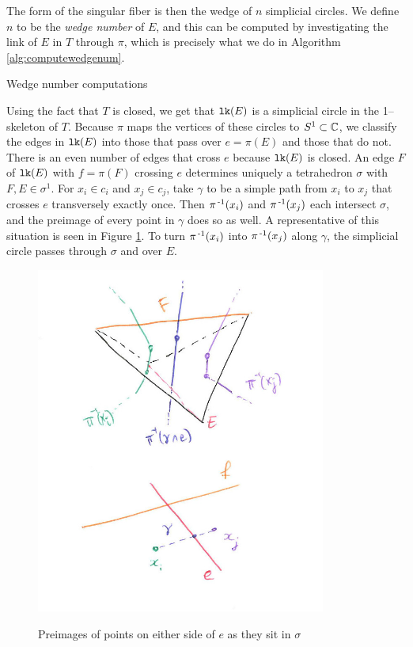 The form of the singular fiber is then the wedge of $n$ simplicial circles.
We define $n$ to be the \emph{wedge number} of $E$, and this can be computed by investigating the link of $E$ in $T$ through $\pi$, which is precisely what we do in Algorithm \ref{alg:computewedgenum}.

\begin{algorithm}[h]
	\caption{Wedge number computations}
	\label{alg:computewedgenum}
\end{algorithm}

Using the fact that $T$ is closed, we get that $\texttt{lk}(E)$ is a simplicial circle in the 1--skeleton of $T$.
Because $\pi$ maps the vertices of these circles to $S^1\subset\mathbb{C}$, we classify the edges in $\texttt{lk}(E)$ into those that pass over $e=\pi(E)$ and those that do not.
There is an even number of edges that cross $e$ because $\texttt{lk}(E)$ is closed.
An edge $F$ of $\texttt{lk}(E)$ with $f=\pi(F)$ crossing $e$ determines uniquely a tetrahedron $\sigma$ with $F,E\in\sigma^1$.
For $x_i\in c_i$ and $x_j\in c_j$, take $\gamma$ to be a simple path from $x_i$ to $x_j$ that crosses $e$ transversely exactly once.
Then $\pi^{\,\text{-}1}(x_i)$ and $\pi^{\,\text{-}1}(x_j)$ each intersect $\sigma$, and the preimage of every point in $\gamma$ does so as well.
A representative of this situation is seen in Figure \ref{fig:gammapullback}.
To turn $\pi^{\,\text{-}1}(x_i)$ into $\pi^{\,\text{-}1}(x_j)$ along $\gamma$, the simplicial circle passes through $\sigma$ and over $E$.

\begin{figure}
	\centering
	\captionsetup{justification=centering}
	\caption{Preimages of points on either side of $e$ as they sit in $\sigma$}
	\includegraphics[width=3.75in]{figures/gammapullback.jpg}
	\label{fig:gammapullback}
\end{figure}


